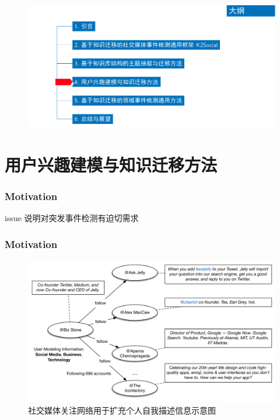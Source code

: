 \begin{withoutheadline}
\begin{frame}
\vspace*{-13mm}
\begin{figure}
	\hspace*{-4.2mm}
    \includegraphics[width=1.0\paperwidth]{img/contents4_output.pdf}
\end{figure}

\end{frame}
\end{withoutheadline}

\section{用户兴趣建模与知识迁移方法}


\begin{frame}
\frametitle{Motivation}	
issue
说明对突发事件检测有迫切需求

\end{frame}


\begin{frame}
\frametitle{Motivation}
\begin{figure}[h]
		\setlength{\abovecaptionskip}{0.cm}
        \setlength{\belowcaptionskip}{0.cm}
        \centering
		\caption{社交媒体关注网络用于扩充个人自我描述信息示意图}
        \includegraphics[width=0.9\columnwidth]{img/UMIETM/UMIETM_profile.pdf}
\end{figure}
\end{frame}

